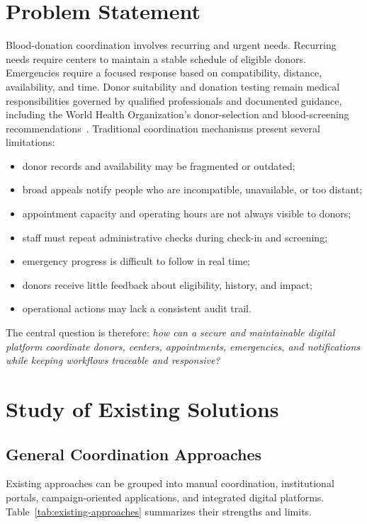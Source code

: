 \section{Problem Statement}
Blood-donation coordination involves recurring and urgent needs. Recurring needs require centers to maintain a stable schedule of eligible donors. Emergencies require a focused response based on compatibility, distance, availability, and time. Donor suitability and donation testing remain medical responsibilities governed by qualified professionals and documented guidance, including the World Health Organization's donor-selection and blood-screening recommendations~\cite{whoDonorSelection,whoDonationTesting}. Traditional coordination mechanisms present several limitations:

\begin{itemize}
  \item donor records and availability may be fragmented or outdated;
  \item broad appeals notify people who are incompatible, unavailable, or too distant;
  \item appointment capacity and operating hours are not always visible to donors;
  \item staff must repeat administrative checks during check-in and screening;
  \item emergency progress is difficult to follow in real time;
  \item donors receive little feedback about eligibility, history, and impact;
  \item operational actions may lack a consistent audit trail.
\end{itemize}

The central question is therefore: \emph{how can a secure and maintainable digital platform coordinate donors, centers, appointments, emergencies, and notifications while keeping workflows traceable and responsive?}

\section{Study of Existing Solutions}
\subsection{General Coordination Approaches}
Existing approaches can be grouped into manual coordination, institutional portals, campaign-oriented applications, and integrated digital platforms. Table~\ref{tab:existing-approaches} summarizes their strengths and limits.

